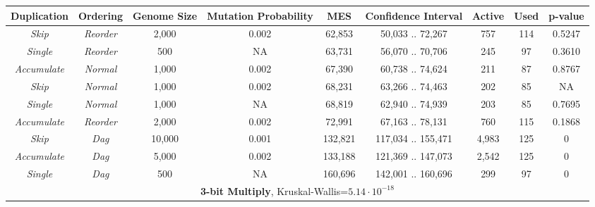 \documentclass[journal]{IEEEtran}
\begin{document}
\begin{table}
\begin{tabular}{|c|c|c|c|c|c|c|c|c|}
\textbf{Duplication} & \textbf{Ordering} & \textbf{Genome Size} & \textbf{Mutation Probability} & \textbf{MES} & \textbf{Confidence Interval} & \textbf{Active} & \textbf{Used} & \textbf{p-value} \\ \hline
\emph{Skip} & \emph{Reorder}       &  2,000 & 0.002 &  62,853 & 50,033 .. 72,267 &   757 & 114 & 0.5247 \\ \hline
\emph{Single} & \emph{Reorder}     &    500 &    NA &  63,731 & 56,070 .. 70,706 &   245 &  97 & 0.3610 \\ \hline
\emph{Accumulate} & \emph{Normal}  &  1,000 & 0.002 &  67,390 & 60,738 .. 74,624 &   211 &  87 & 0.8767 \\ \hline
\rowcolor{Gray}
\emph{Skip} & \emph{Normal}        &  1,000 & 0.002 &  68,231 & 63,266 .. 74,463 &   202 &  85 & NA \\ \hline
\emph{Single} & \emph{Normal}      &  1,000 &    NA &  68,819 & 62,940 .. 74,939 &   203 &  85 & 0.7695 \\ \hline
\emph{Accumulate} & \emph{Reorder} &  2,000 & 0.002 &  72,991 & 67,163 .. 78,131 &   760 & 115 & 0.1868 \\ \hline
\emph{Skip} & \emph{Dag}           & 10,000 & 0.001 & 132,821 & 117,034 .. 155,471 & 4,983 & 125 & 0 \\ \hline
\emph{Accumulate} & \emph{Dag}     &  5,000 & 0.002 & 133,188 & 121,369 .. 147,073 & 2,542 & 125 & 0 \\ \hline
\emph{Single} & \emph{Dag}         &    500 &    NA & 160,696 & 142,001 .. 160,696 &   299 &  97 & 0 \\ \hline\hline

	  \multicolumn{9}{|c|}{\textbf{3-bit Multiply}, Kruskal-Wallis=$5.14\cdot 10^{-18}$} \\ \hline


\end{tabular}
\end{table}
\end{document}
